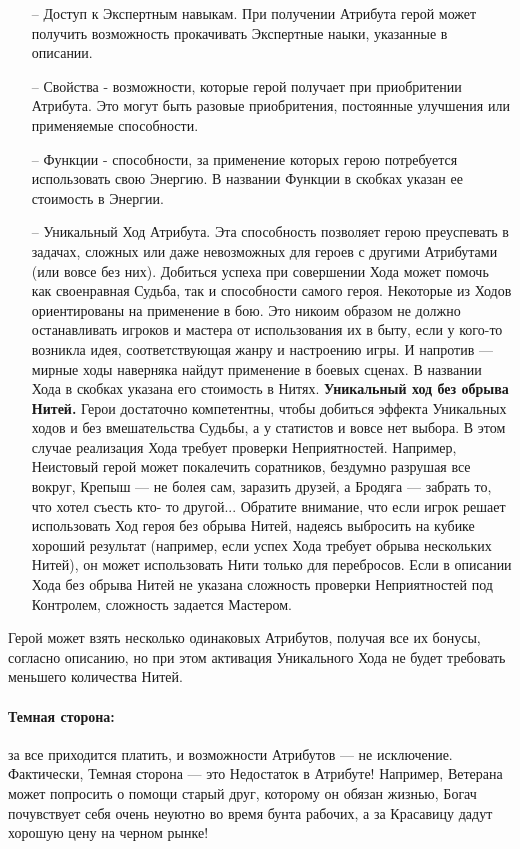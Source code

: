 \begin{itemize}
\item[--] Доступ к Экспертным навыкам. При получении Атрибута герой может получить возможность прокачивать Экспертные наыки, указанные в описании.
\item[--] Свойства - возможности, которые герой получает при приобритении Атрибута. Это могут быть разовые приобритения, постоянные улучшения или применяемые способности.
\item[--] Функции - способности, за применение которых герою потребуется использовать свою Энергию. В названии Функции в скобках указан ее стоимость в Энергии.
\item[--] Уникальный Ход Атрибута. Эта способность позволяет герою преуспевать в задачах, сложных или даже невозможных для героев с другими Атрибутами (или вовсе без них). Добиться успеха при совершении Хода может помочь как своенравная Судьба, так и способности самого героя. Некоторые из Ходов ориентированы на применение в бою. Это никоим образом не должно останавливать игроков и мастера от использования их в быту, если у кого-то возникла идея, соответствующая жанру и настроению игры. И напротив — мирные ходы наверняка найдут применение в боевых сценах. В названии Хода в скобках указана его стоимость в Нитях.
\newline \textbf{Уникальный ход без обрыва Нитей.} Герои достаточно компетентны, чтобы добиться эффекта Уникальных ходов и без вмешательства Судьбы, а у статистов и вовсе нет выбора. В этом случае реализация Хода требует проверки Неприятностей. Например, Неистовый герой может покалечить соратников, бездумно разрушая все вокруг, Крепыш — не болея сам, заразить друзей, а Бродяга — забрать то, что хотел съесть кто- то другой...
\newline
Обратите внимание, что если игрок решает использовать Ход героя без обрыва Нитей, надеясь выбросить на кубике хороший результат (например, если успех Хода требует обрыва нескольких Нитей), он может использовать Нити только для перебросов.
\newline
Если в описании Хода без обрыва Нитей не указана сложность проверки Неприятностей под Контролем, сложность задается Мастером.
\end{itemize}
\begin{tcolorbox}
Герой может взять несколько одинаковых Атрибутов, получая все их бонусы, согласно описанию, но при этом активация Уникального Хода не будет требовать меньшего количества Нитей.
\end{tcolorbox}
\paragraph{Темная сторона:} за все приходится платить, и возможности Атрибутов — не исключение. Фактически, Темная сторона — это Недостаток в Атрибуте! Например, Ветерана может попросить о помощи старый друг, которому он обязан жизнью, Богач почувствует себя очень неуютно во время бунта рабочих, а за Красавицу дадут хорошую цену на черном рынке!
